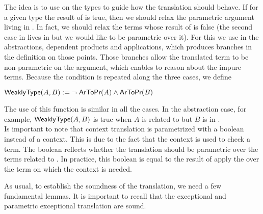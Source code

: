 The idea is to use \propFun{} on the types to guide how the translation should behave. If for a 
given type the result of \propFun{} is true, then we should relax the parametric argument living in \Type{}.
In fact, we should relax the terms whose result of \propFun{} is false (the second case 
in  lives in \Type{} but we would like to be parametric over it). 
For this we use \propFun{} in the abstractions, dependent products and applications, which produces branches in
the definition on those points. Those branches allow the translated term 
to be non-parametric on the argument, which enables to 
reason about the impure terms. Because the condition is repeated along the three cases, we define 
\begin{center}
$\weaklypropFun[A,B]\termDef\neg\ \propFun[A] \wedge \propFun[B]$
\end{center}
The use of this function is similar in all the cases. In the abstraction case, for example, 
$\weaklypropFun[A,B]$
is true when $A$ is related to \Type{} but $B$ is in \Prop{}.\\
Is important to note that context translation is parametrized with a boolean instead of a context.
This is due to the fact that the context is used to check a term. The boolean reflects whether the 
translation should be parametric over the terms related to \Type.
In practice, this boolean is equal to the result of apply the \propFun{} over the term on which 
the context is needed.

As usual, to establish the 
soundness of the translation, we need a few fundamental lemmas. It is important to recall that 
the exceptional and parametric exceptional translation are sound.

